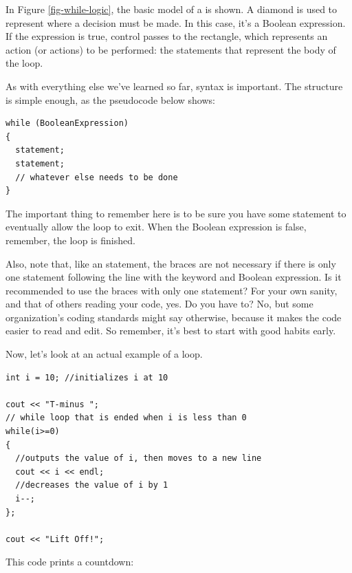 In Figure \ref{fig-while-logic}, the basic model of a  is shown.
A diamond is used to represent where a decision must be made.
In this case, it's a Boolean expression.
If the expression is true, control passes to the rectangle, which represents an action (or actions) to be performed: the statements that represent the body of the loop.

As with everything else we've learned so far, syntax is important. The structure is simple enough, as the pseudocode below shows:

\noindent\begin{minipage}{\linewidth}\begin{lstlisting}
while (BooleanExpression)
{
  statement;
  statement;
  // whatever else needs to be done
}
\end{lstlisting}\end{minipage}

The important thing to remember here is to be sure you have some statement to eventually allow the loop to exit.
When the Boolean expression is false, remember, the loop is finished.

Also, note that, like an  statement, the braces are not necessary if there is only one statement following the line with the  keyword and Boolean expression.
Is it recommended to use the braces with only one statement?
For your own sanity, and that of others reading your code, yes.
Do you have to?
No, but some organization's coding standards might say otherwise, because it makes the code easier to read and edit.
So remember, it's best to start with good habits early.

Now, let's look at an actual example of a  loop. \nopagebreak[4]

\noindent\begin{minipage}{\linewidth}\begin{lstlisting}
int i = 10;	//initializes i at 10

cout << "T-minus ";
// while loop that is ended when i is less than 0
while(i>=0)	
{ 
  //outputs the value of i, then moves to a new line
  cout << i << endl;	
  //decreases the value of i by 1
  i--;	
};

cout << "Lift Off!";
\end{lstlisting}\end{minipage}

This code prints a countdown:

\noindent{}

\noindent{}

